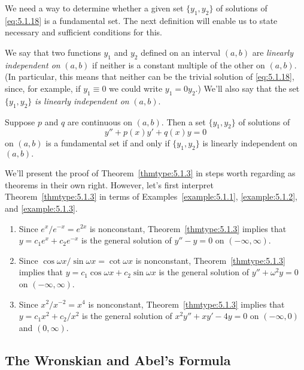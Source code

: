 \documentclass{ximera}
\begin{document}
We need a way to determine whether a given set $\{y_1,y_2\}$
of solutions of \eqref{eq:5.1.18}  is a fundamental set.
The next definition will enable us to state necessary and
sufficient conditions for this.

We say that two functions $y_1$ and $y_2$ defined on an interval
$(a,b)$ are \textit{linearly independent on} $(a,b)$ if neither is a
constant multiple of the other on $(a,b)$. (In
particular, this means
that neither can be the trivial solution of \eqref{eq:5.1.18}, since, for
example, if $y_1\equiv0$  we could write $y_1=0y_2$.) We'll also
say that the set $\{y_1,y_2\}$ \textit{is linearly independent on}
$(a,b)$.

 \begin{theorem}\label{thmtype:5.1.3}
Suppose $p$ and $q$ are continuous on $(a,b).$ Then a set
$\{y_1,y_2\}$ of solutions of
\begin{equation}\label{eq:5.1.20}
y''+p(x)y'+q(x)y=0
\end{equation}
on $(a,b)$ is a fundamental set if and only if $\{y_1,y_2\}$ is
linearly independent on $(a,b).$
\end{theorem}

We'll present the proof of Theorem~\ref{thmtype:5.1.3} in steps worth
regarding as theorems in their own right. However, let's first
interpret Theorem~\ref{thmtype:5.1.3} in terms of
Examples~\ref{example:5.1.1}, \ref{example:5.1.2}, and \ref{example:5.1.3}.

\begin{example}\label{example:5.1.4}   
\begin{enumerate}
\item\label{item:5.1.4a}%
Since $e^x/e^{-x}=e^{2x}$ is nonconstant, Theorem~\ref{thmtype:5.1.3}
implies that $y=c_1e^x+c_2e^{-x}$ is the general solution of $y''-y=0$
on $(-\infty,\infty)$.
\item\label{item:5.1.4b}%
Since $\cos\omega x/\sin\omega x=\cot\omega x$ is nonconstant,
Theorem~\ref{thmtype:5.1.3} implies that
 $y=c_1\cos\omega x+c_2\sin\omega x$ is the general solution
of $y''+\omega^2y=0$ on $(-\infty,\infty)$.
\item\label{item:5.1.4c} %
Since $x^2/x^{-2}=x^4$ is nonconstant,
Theorem~\ref{thmtype:5.1.3} implies that
 $y=c_1x^2+c_2/x^2$ is the general
solution of $x^2y''+xy'-4y=0$ on $(-\infty,0)$ and $(0,\infty)$.
\end{enumerate}
\end{example}


\subsection*{The Wronskian and Abel's Formula}
\end{document}
